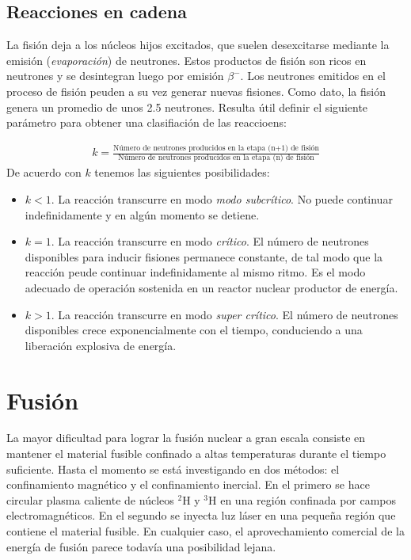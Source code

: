 \subsection{Reacciones en cadena}

La fisión deja a los núcleos hijos excitados, que suelen desexcitarse mediante la emisión (\textit{evaporación}) de neutrones. Estos productos de fisión son ricos en neutrones y se desintegran luego por emisión $\beta^-$. Los neutrones emitidos en el proceso de fisión peuden a su vez generar nuevas fisiones. Como dato, la fisión  genera un promedio de unos 2.5 neutrones. Resulta útil definir el siguiente parámetro para obtener una clasifiación de las reaccioens:

\begin{eqnarray}    
    k = \frac{\text{Número de neutrones producidos en la etapa (n+1) de fisión}}{\text{Número de neutrones producidos en la etapa (n) de fisión}}
\end{eqnarray}
De acuerdo con $k$ tenemos las siguientes posibilidades:

\begin{itemize}
    \item $k<1$. La reacción transcurre en modo \textit{modo subcrítico}. No puede continuar indefinidamente y en algún momento se detiene.
    \item $k=1$. La reacción transcurre en modo \textit{crítico}. El número de neutrones disponibles para inducir fisiones permanece constante, de tal modo que la reacción peude continuar indefinidamente al mismo ritmo. Es el modo adecuado de operación sostenida en un reactor nuclear productor de energía.
    \item $k>1$. La reacción transcurre en modo \textit{super crítico}. El número de neutrones disponibles crece exponencialmente con el tiempo, conduciendo a una liberación explosiva de energía.
\end{itemize}

\section{Fusión}

La mayor dificultad para lograr la fusión nuclear a gran escala consiste en mantener el material fusible confinado a altas temperaturas durante el tiempo suficiente. Hasta el momento se está investigando en dos métodos: el confinamiento magnético y el confinamiento inercial. En el primero se hace circular plasma caliente de núcleos $^2$H y $^3$H en una región confinada por campos electromagnéticos. En el segundo se inyecta luz láser en una pequeña región que contiene el material fusible. En cualquier caso, el aprovechamiento comercial de la energía de fusión parece todavía una posibilidad lejana.

